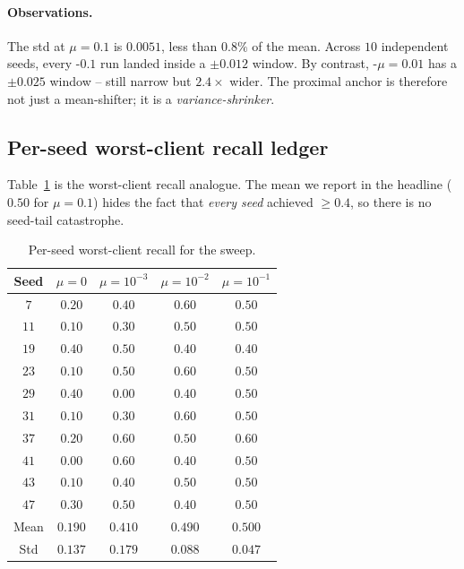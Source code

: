 \paragraph{Observations.}
The std at $\mu\!=\!0.1$ is $0.0051$, less than $0.8\%$ of the
mean. Across $10$ independent seeds, every \fedprox{}-$0.1$ run
landed inside a $\pm 0.012$ \auprc{} window. By contrast,
\fedprox{}-$\mu\!=\!0.01$ has a $\pm 0.025$ window -- still narrow
but $2.4\!\times$ wider. The proximal anchor is therefore not just a
mean-shifter; it is a \emph{variance-shrinker}.

\subsection{Per-seed worst-client recall ledger}

Table~\ref{tab:fedprox-worstrec} is the worst-client recall analogue.
The mean we report in the headline ($0.50$ for $\mu\!=\!0.1$) hides
the fact that \emph{every seed} achieved $\geq 0.4$, so there is no
seed-tail catastrophe.

\begin{table}[h]
\centering
\caption{Per-seed worst-client recall for the \fedprox{} sweep.}
\label{tab:fedprox-worstrec}
\small
\begin{tabular}{c | c c c c}
\toprule
Seed & $\mu\!=\!0$ & $\mu\!=\!10^{-3}$ & $\mu\!=\!10^{-2}$ & $\mu\!=\!10^{-1}$ \\
\midrule
$7$  & $0.20$ & $0.40$ & $0.60$ & $0.50$ \\
$11$ & $0.10$ & $0.30$ & $0.50$ & $0.50$ \\
$19$ & $0.40$ & $0.50$ & $0.40$ & $0.40$ \\
$23$ & $0.10$ & $0.50$ & $0.60$ & $0.50$ \\
$29$ & $0.40$ & $0.00$ & $0.40$ & $0.50$ \\
$31$ & $0.10$ & $0.30$ & $0.60$ & $0.50$ \\
$37$ & $0.20$ & $0.60$ & $0.50$ & $0.60$ \\
$41$ & $0.00$ & $0.60$ & $0.40$ & $0.50$ \\
$43$ & $0.10$ & $0.40$ & $0.50$ & $0.50$ \\
$47$ & $0.30$ & $0.50$ & $0.40$ & $0.50$ \\
\midrule
Mean & $0.190$ & $0.410$ & $0.490$ & $0.500$ \\
Std  & $0.137$ & $0.179$ & $0.088$ & $0.047$ \\
\bottomrule
\end{tabular}
\end{table}

